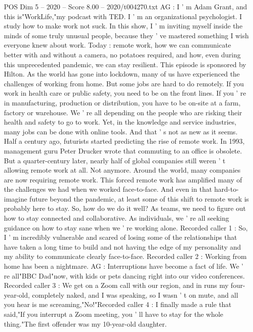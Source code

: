 \begin{textsample}{POS Dim 5 – 2020 – Score 8.00 – 2020/t004270.txt}
AG : I ' m Adam Grant, and this is"WorkLife,"my podcast with TED.
I ' m an organizational psychologist.
I study how to make work not suck.
In this show, I ' m inviting myself inside the minds of some truly unusual people, because they ' ve mastered something I wish everyone knew about work.
Today : remote work, how we can communicate better with and without a camera, no potatoes required, and how, even during this unprecedented pandemic, we can stay resilient.
This episode is sponsored by Hilton.
As the world has gone into lockdown, many of us have experienced the challenges of working from home.
But some jobs are hard to do remotely.
If you work in health care or public safety, you need to be on the front lines.
If you ' re in manufacturing, production or distribution, you have to be on-site at a farm, factory or warehouse.
We ' re all depending on the people who are risking their health and safety to go to work.
Yet, in the knowledge and service industries, many jobs can be done with online tools.
And that ' s not as new as it seems.
Half a century ago, futurists started predicting the rise of remote work.
In 1993, management guru Peter Drucker wrote that commuting to an office is obsolete.
But a quarter-century later, nearly half of global companies still weren ' t allowing remote work at all.
Not anymore.
Around the world, many companies are now requiring remote work.
This forced remote work has amplified many of the challenges we had when we worked face-to-face.
And even in that hard-to-imagine future beyond the pandemic, at least some of this shift to remote work is probably here to stay.
So, how do we do it well?
As teams, we need to figure out how to stay connected and collaborative.
As individuals, we ' re all seeking guidance on how to stay sane when we ' re working alone.
Recorded caller 1 : So, I ' m incredibly vulnerable and scared of losing some of the relationships that have taken a long time to build and not having the edge of my personality and my ability to communicate clearly face-to-face.
Recorded caller 2 : Working from home has been a nightmare.
AG : Interruptions have become a fact of life.
We ' re all"BBC Dad"now, with kids or pets dancing right into our video conferences.
Recorded caller 3 : We get on a Zoom call with our region, and in runs my four-year-old, completely naked, and I was speaking, so I wasn ' t on mute, and all you hear is me screaming,"No!"Recorded caller 4 : I finally made a rule that said,"If you interrupt a Zoom meeting, you ' ll have to stay for the whole thing."The first offender was my 10-year-old daughter.

\end{textsample}
